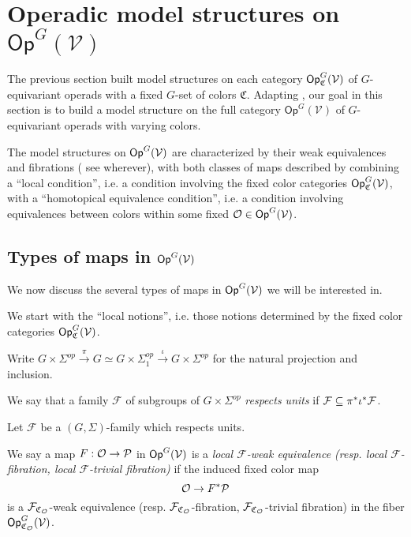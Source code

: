 \documentclass[a4paper,10pt
,draft
]{article}%
\renewcommand{\F}{\mathcal F}
\renewcommand{\1}{\eta}%
\begin{document}
\newpage


\section{Operadic model structures on $\mathsf{Op}^G(\mathcal{V})$}\label{MS_SEC}
\renewcommand{\C}{\mathfrak C}



The previous section built model structures on each category
$\mathsf{Op}_{\mathfrak{C}}^G(\mathcal V)$
of $G$-equivariant operads with a fixed $G$-set of colors $\mathfrak{C}$.
Adapting \cite{BM13,Cav,CM13b}, 
our goal in this section is to build a model structure on the full category $\mathsf{Op}^G(\mathcal{V})$
of $G$-equivariant operads with varying colors. 

The model structures on $\mathsf{Op}^G(\mathcal V)$ are characterized by their weak equivalences and fibrations
({\color{red} see wherever}), 
with both classes of maps described by combining a ``local condition'', i.e. a condition involving the fixed color categories $\mathsf{Op}_{\mathfrak{C}}^G(\mathcal V)$,
with a ``homotopical equivalence condition'',
i.e. a condition involving equivalences between colors within
some fixed $\mathcal{O} \in \mathsf{Op}^G(\mathcal V)$.



\subsection{Types of maps in $\mathsf{Op}^G(\mathcal V)$}

We now discuss the several types of maps in 
$\mathsf{Op}^G(\mathcal V)$ we will be interested in.

We start with the ``local notions'', 
i.e. those notions determined by the fixed color categories $\mathsf{Op}_{\mathfrak{C}}^G(\mathcal V)$.


\begin{definition}
Write $G \times \Sigma^{op} \xrightarrow{\pi} 
G \simeq G \times \Sigma_1^{op} \xrightarrow{\iota} G \times \Sigma^{op}$
for the natural projection and inclusion.

We say that a family $\F$ of subgroups of $G\times \Sigma^{op}$
\emph{respects units} if $\F \subseteq \pi^{\**} \iota^{\**} \F$.
\end{definition}


\begin{definition}
Let $\F$ be a $(G, \Sigma)$-family which respects units.

We say a map $F: \mathcal{O} \to \mathcal{P}$ in $\mathsf{Op}^G(\mathcal V)$
is a \emph{local $\F$-weak equivalence (resp. local $\F$-fibration, local $\F$-trivial fibration)}
if the induced fixed color map
\[\O \to F^{\**} \P\]
is a $\F_{\mathfrak{C}_{\O}}$-weak equivalence (resp. $\F_{\mathfrak{C}_{\O}}$-fibration, $\F_{\mathfrak{C}_{\O}}$-trivial fibration) in the fiber $\mathsf{Op}^G_{\mathfrak{C}_{\mathcal{O}}}(\mathcal V)$.
\end{definition}
\end{document}
